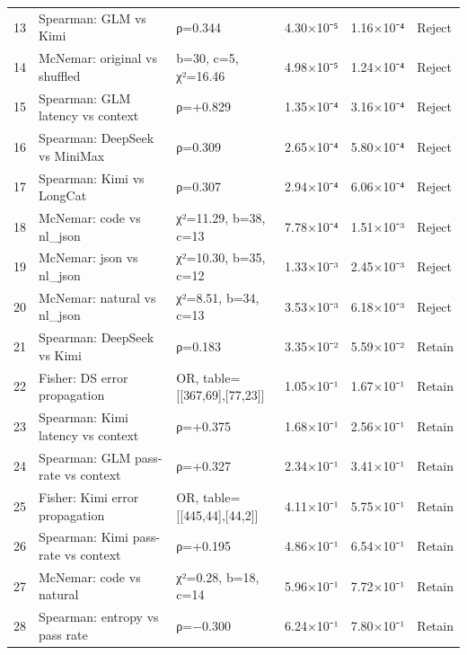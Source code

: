 {\begin{longtable}[]{@{}llllll@{}}
13 & Spearman: GLM vs Kimi & ρ=0.344 & 4.30×10⁻⁵ & 1.16×10⁻⁴ & Reject \\

14 & McNemar: original vs shuffled & b=30, c=5, χ²=16.46 & 4.98×10⁻⁵ & 1.24×10⁻⁴ & Reject \\

15 & Spearman: GLM latency vs context & ρ=+0.829 & 1.35×10⁻⁴ & 3.16×10⁻⁴ & Reject \\

16 & Spearman: DeepSeek vs MiniMax & ρ=0.309 & 2.65×10⁻⁴ & 5.80×10⁻⁴ & Reject \\

17 & Spearman: Kimi vs LongCat & ρ=0.307 & 2.94×10⁻⁴ & 6.06×10⁻⁴ & Reject \\

18 & McNemar: code vs nl\_json & χ²=11.29, b=38, c=13 & 7.78×10⁻⁴ & 1.51×10⁻³ & Reject \\

19 & McNemar: json vs nl\_json & χ²=10.30, b=35, c=12 & 1.33×10⁻³ & 2.45×10⁻³ & Reject \\

20 & McNemar: natural vs nl\_json & χ²=8.51, b=34, c=13 & 3.53×10⁻³ & 6.18×10⁻³ & Reject \\

21 & Spearman: DeepSeek vs Kimi & ρ=0.183 & 3.35×10⁻² & 5.59×10⁻² & Retain \\

22 & Fisher: DS error propagation & OR, table={[}{[}367,69{]},{[}77,23{]}{]} & 1.05×10⁻¹ & 1.67×10⁻¹ & Retain \\

23 & Spearman: Kimi latency vs context & ρ=+0.375 & 1.68×10⁻¹ & 2.56×10⁻¹ & Retain \\

24 & Spearman: GLM pass-rate vs context & ρ=+0.327 & 2.34×10⁻¹ & 3.41×10⁻¹ & Retain \\

25 & Fisher: Kimi error propagation & OR, table={[}{[}445,44{]},{[}44,2{]}{]} & 4.11×10⁻¹ & 5.75×10⁻¹ & Retain \\

26 & Spearman: Kimi pass-rate vs context & ρ=+0.195 & 4.86×10⁻¹ & 6.54×10⁻¹ & Retain \\

27 & McNemar: code vs natural & χ²=0.28, b=18, c=14 & 5.96×10⁻¹ & 7.72×10⁻¹ & Retain \\

28 & Spearman: entropy vs pass rate & ρ=−0.300 & 6.24×10⁻¹ & 7.80×10⁻¹ & Retain \\


\end{longtable}}
